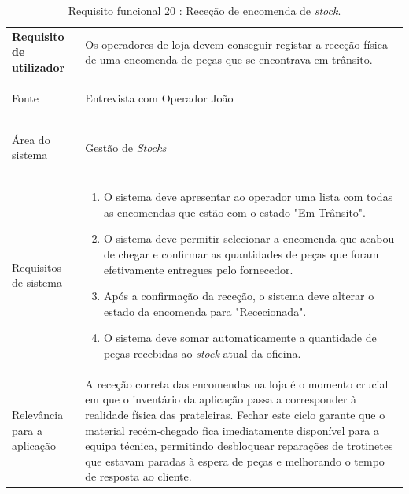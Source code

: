 \documentclass[a4paper,12pt]{scrreprt}
\begin{document}
\begin{table}[H]
    \centering
    \renewcommand{\arraystretch}{1.5} 
    
    \begin{tabular}{|>{\columncolor{gray!15}\bfseries}p{4cm}|p{10.5cm}|}
        \hline
        Requisito de utilizador & Os operadores de loja devem conseguir registar a receção física de uma encomenda de peças que se encontrava em trânsito. \\ \hdashline
        
        Fonte & Entrevista com Operador João \\ \hdashline
        
        Área do sistema & Gestão de \textit{Stocks} \\ \hdashline
        
        Requisitos de sistema & 
        \begin{enumerate}[leftmargin=*, nosep, topsep=2pt, partopsep=0pt]
            \item O sistema deve apresentar ao operador uma lista com todas as encomendas que estão com o estado "Em Trânsito".
            \item O sistema deve permitir selecionar a encomenda que acabou de chegar e confirmar as quantidades de peças que foram efetivamente entregues pelo fornecedor.
            \item Após a confirmação da receção, o sistema deve alterar o estado da encomenda para "Rececionada".
            \item O sistema deve somar automaticamente a quantidade de peças recebidas ao \textit{stock} atual da oficina.
        \end{enumerate} \\ \hdashline
        
        Relevância para a aplicação & A receção correta das encomendas na loja é o momento crucial em que o inventário da aplicação passa a corresponder à realidade física das prateleiras. Fechar este ciclo garante que o material recém-chegado fica imediatamente disponível para a equipa técnica, permitindo desbloquear reparações de trotinetes que estavam paradas à espera de peças e melhorando o tempo de resposta ao cliente. \\ \hline
    \end{tabular}
    \caption{Requisito funcional 20 : Receção de encomenda de \textit{stock}.}
    \label{tab:rf_rececao_encomenda}
\end{table}
\end{document}
